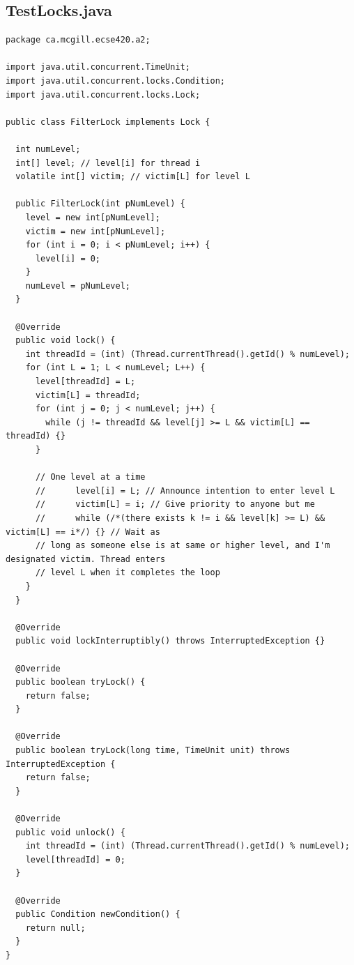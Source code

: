 \documentclass[11pt,letterpaper]{exam}
\begin{document}
\subsection*{TestLocks.java}
\begin{lstlisting}
package ca.mcgill.ecse420.a2;

import java.util.concurrent.TimeUnit;
import java.util.concurrent.locks.Condition;
import java.util.concurrent.locks.Lock;

public class FilterLock implements Lock {

  int numLevel;
  int[] level; // level[i] for thread i
  volatile int[] victim; // victim[L] for level L

  public FilterLock(int pNumLevel) {
    level = new int[pNumLevel];
    victim = new int[pNumLevel];
    for (int i = 0; i < pNumLevel; i++) {
      level[i] = 0;
    }
    numLevel = pNumLevel;
  }

  @Override
  public void lock() {
    int threadId = (int) (Thread.currentThread().getId() % numLevel);
    for (int L = 1; L < numLevel; L++) {
      level[threadId] = L;
      victim[L] = threadId;
      for (int j = 0; j < numLevel; j++) {
        while (j != threadId && level[j] >= L && victim[L] == threadId) {}
      }

      // One level at a time
      //      level[i] = L; // Announce intention to enter level L
      //      victim[L] = i; // Give priority to anyone but me
      //      while (/*(there exists k != i && level[k] >= L) && victim[L] == i*/) {} // Wait as
      // long as someone else is at same or higher level, and I'm designated victim. Thread enters
      // level L when it completes the loop
    }
  }

  @Override
  public void lockInterruptibly() throws InterruptedException {}

  @Override
  public boolean tryLock() {
    return false;
  }

  @Override
  public boolean tryLock(long time, TimeUnit unit) throws InterruptedException {
    return false;
  }

  @Override
  public void unlock() {
    int threadId = (int) (Thread.currentThread().getId() % numLevel);
    level[threadId] = 0;
  }

  @Override
  public Condition newCondition() {
    return null;
  }
}
\end{lstlisting}
\end{document}
